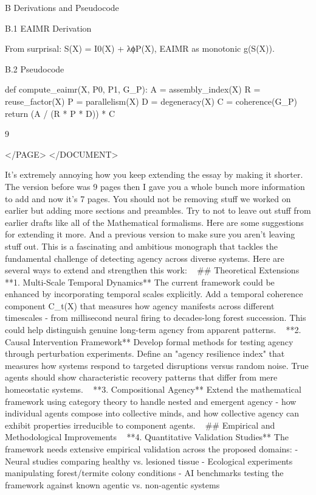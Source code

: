 \documentclass{article}
\begin{document}
B
Derivations and Pseudocode

B.1
EAIMR Derivation

From surprisal: S(X) = I0(X) + λϕP(X), EAIMR as monotonic g(S(X)).

B.2
Pseudocode

def compute_eaimr(X, P0, P1, G_P):
A = assembly_index(X)
R = reuse_factor(X)
P = parallelism(X)
D = degeneracy(X)
C = coherence(G_P)
return (A / (R * P * D)) * C

9

 </PAGE>
</DOCUMENT>

It's extremely annoying how you keep extending the essay by making it shorter. The version before was 9 pages then I gave you a whole bunch more information to add and now it's 7 pages. You should not be removing stuff we worked on earlier but adding more sections and preambles. Try to not to leave out stuff from earlier drafts like all of the Mathematical formalisms. Here are some suggestions for extending it more. And a previous version to make sure you aren't leaving stuff out. This is a fascinating and ambitious monograph that tackles the fundamental challenge of detecting agency across diverse systems. Here are several ways to extend and strengthen this work:
 
## Theoretical Extensions
 
**1. Multi-Scale Temporal Dynamics**
The current framework could be enhanced by incorporating temporal scales explicitly. Add a temporal coherence component C_t(X) that measures how agency manifests across different timescales - from millisecond neural firing to decades-long forest succession. This could help distinguish genuine long-term agency from apparent patterns.
 
**2. Causal Intervention Framework**
Develop formal methods for testing agency through perturbation experiments. Define an "agency resilience index" that measures how systems respond to targeted disruptions versus random noise. True agents should show characteristic recovery patterns that differ from mere homeostatic systems.
 
**3. Compositional Agency**
Extend the mathematical framework using category theory to handle nested and emergent agency - how individual agents compose into collective minds, and how collective agency can exhibit properties irreducible to component agents.
 
## Empirical and Methodological Improvements
 
**4. Quantitative Validation Studies**
The framework needs extensive empirical validation across the proposed domains:
- Neural studies comparing healthy vs. lesioned tissue
- Ecological experiments manipulating forest/termite colony conditions
- AI benchmarks testing the framework against known agentic vs. non-agentic systems
\end{document}
